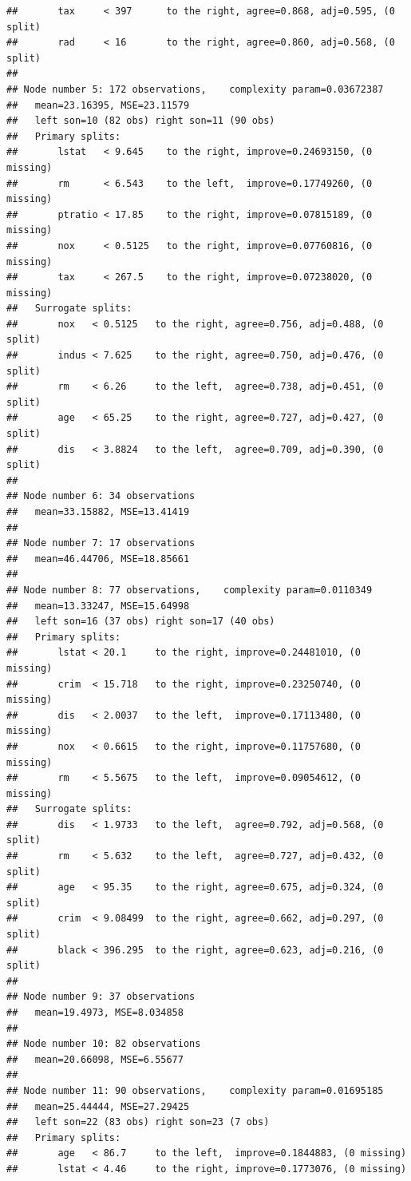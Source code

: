 \documentclass[
]{book}
\theoremstyle{plain}
\theoremstyle{definition}
\theoremstyle{definition}
\theoremstyle{definition}
\theoremstyle{definition}
\theoremstyle{remark}
\begin{document}
\begin{verbatim}
##       tax     < 397      to the right, agree=0.868, adj=0.595, (0 split)
##       rad     < 16       to the right, agree=0.860, adj=0.568, (0 split)
## 
## Node number 5: 172 observations,    complexity param=0.03672387
##   mean=23.16395, MSE=23.11579 
##   left son=10 (82 obs) right son=11 (90 obs)
##   Primary splits:
##       lstat   < 9.645    to the right, improve=0.24693150, (0 missing)
##       rm      < 6.543    to the left,  improve=0.17749260, (0 missing)
##       ptratio < 17.85    to the right, improve=0.07815189, (0 missing)
##       nox     < 0.5125   to the right, improve=0.07760816, (0 missing)
##       tax     < 267.5    to the right, improve=0.07238020, (0 missing)
##   Surrogate splits:
##       nox   < 0.5125   to the right, agree=0.756, adj=0.488, (0 split)
##       indus < 7.625    to the right, agree=0.750, adj=0.476, (0 split)
##       rm    < 6.26     to the left,  agree=0.738, adj=0.451, (0 split)
##       age   < 65.25    to the right, agree=0.727, adj=0.427, (0 split)
##       dis   < 3.8824   to the left,  agree=0.709, adj=0.390, (0 split)
## 
## Node number 6: 34 observations
##   mean=33.15882, MSE=13.41419 
## 
## Node number 7: 17 observations
##   mean=46.44706, MSE=18.85661 
## 
## Node number 8: 77 observations,    complexity param=0.0110349
##   mean=13.33247, MSE=15.64998 
##   left son=16 (37 obs) right son=17 (40 obs)
##   Primary splits:
##       lstat < 20.1     to the right, improve=0.24481010, (0 missing)
##       crim  < 15.718   to the right, improve=0.23250740, (0 missing)
##       dis   < 2.0037   to the left,  improve=0.17113480, (0 missing)
##       nox   < 0.6615   to the right, improve=0.11757680, (0 missing)
##       rm    < 5.5675   to the left,  improve=0.09054612, (0 missing)
##   Surrogate splits:
##       dis   < 1.9733   to the left,  agree=0.792, adj=0.568, (0 split)
##       rm    < 5.632    to the left,  agree=0.727, adj=0.432, (0 split)
##       age   < 95.35    to the right, agree=0.675, adj=0.324, (0 split)
##       crim  < 9.08499  to the right, agree=0.662, adj=0.297, (0 split)
##       black < 396.295  to the right, agree=0.623, adj=0.216, (0 split)
## 
## Node number 9: 37 observations
##   mean=19.4973, MSE=8.034858 
## 
## Node number 10: 82 observations
##   mean=20.66098, MSE=6.55677 
## 
## Node number 11: 90 observations,    complexity param=0.01695185
##   mean=25.44444, MSE=27.29425 
##   left son=22 (83 obs) right son=23 (7 obs)
##   Primary splits:
##       age   < 86.7     to the left,  improve=0.1844883, (0 missing)
##       lstat < 4.46     to the right, improve=0.1773076, (0 missing)

\end{verbatim}
\end{document}

